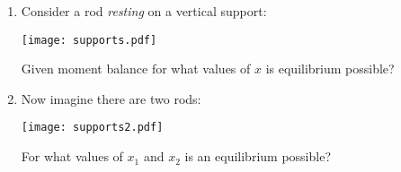 {\begin{enumerate}
            Assuming the ground is smooth For what values of $y$ is
            equilibrium possible if $d < l_0$? What if $d = l_0$ or $d > l_0$?
            Sketch the relationship between $y$ and $d$.

            What would happen if the ground was rough?
        \item Consider a rod \emph{resting} on a vertical support:
            \begin{center}
                \texttt{[image: supports.pdf]}
            \end{center}
            Given moment balance for what values of $x$ is equilibrium
            possible?
        \item Now imagine there are two rods:
            \begin{center}
                \texttt{[image: supports2.pdf]}
            \end{center}
            For what values of $x_1$ and $x_2$ is an equilibrium possible?
    \end{enumerate}
}
